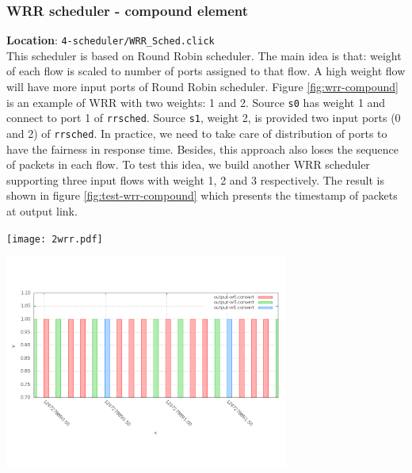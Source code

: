 \documentclass[a4paper]{article}
\begin{document}
  \subsubsection{WRR scheduler - compound element}
  \textbf{Location}: \texttt{4-scheduler/WRR\_Sched.click}\\  
  This scheduler is based on Round Robin scheduler. The main idea is that: weight of each flow is scaled to number of ports assigned to that flow. A high weight flow will have more input ports of Round Robin scheduler. Figure \ref{fig:wrr-compound} is an example of WRR with two weights: 1 and 2. Source \texttt{s0} has weight 1 and connect to port 1 of \texttt{rrsched}. Source \texttt{s1}, weight 2, is provided two input ports (0 and 2) of \texttt{rrsched}. In practice, we need to take care of distribution of ports to have the fairness in response time. Besides, this approach also loses the sequence of packets in each flow. To test this idea, we build another WRR scheduler supporting three input flows with weight 1, 2 and 3 respectively. The result is shown in figure \ref{fig:test-wrr-compound} which presents the timestamp of packets at output link.
  \begin{center}
	\texttt{[image: 2wrr.pdf]}
	\label{fig:wrr-compound}
  \end{center}

  \begin{center}
	\includegraphics[width=0.70\textwidth]{wrr2-dense.png}
	\label{fig:test-wrr-compound}
  \end{center}
  
\end{document}
